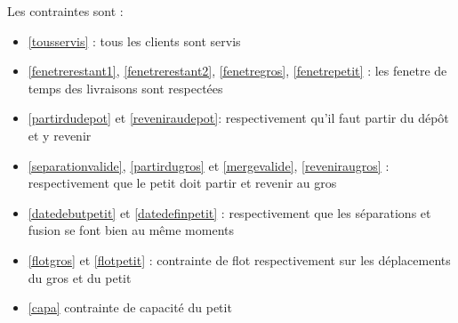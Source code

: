 \documentclass[12pt,a4paper,fleqn]{article}
\begin{document}
\clearpage

Les contraintes sont :
\begin{itemize}
\item \ref{tousservis} : tous les clients sont servis
\item \ref{fenetrerestant1}, \ref{fenetrerestant2}, \ref{fenetregros}, \ref{fenetrepetit} : les fenetre de temps des livraisons sont respectées
\item \ref{partirdudepot} et \ref{reveniraudepot}: respectivement qu'il faut partir du dépôt et y revenir
\item \ref{separationvalide}, \ref{partirdugros} et \ref{mergevalide}, \ref{reveniraugros} : respectivement que le petit doit partir et revenir au gros
\item \ref{datedebutpetit} et \ref{datedefinpetit} : respectivement que les séparations et fusion se font bien au même moments
\item \ref{flotgros} et \ref{flotpetit} : contrainte de flot respectivement sur les déplacements du gros et du petit
\item \ref{capa} contrainte de capacité du petit 
\end{itemize}
\end{document}
